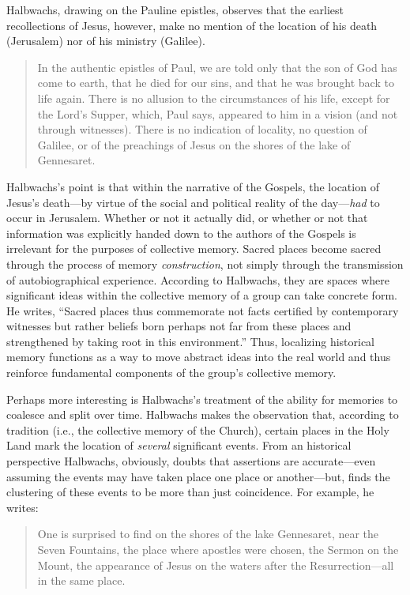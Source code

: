 Halbwachs, drawing on the Pauline epistles, observes that the earliest
recollections of Jesus, however, make no mention of the location of his
death (Jerusalem) nor of his ministry (Galilee).

\begin{quote}
In the authentic epistles of Paul, we are told only that the son of God
has come to earth, that he died for our sins, and that he was brought
back to life again. There is no allusion to the circumstances of his
life, except for the Lord's Supper, which, Paul says, appeared to him in
a vision (and not through witnesses). There is no indication of
locality, no question of Galilee, or of the preachings of Jesus on the
shores of the lake of Gennesaret.\autocite[209]{halbwachs1992}
\end{quote}

Halbwachs's point is that within the narrative of the Gospels, the
location of Jesus's death---by virtue of the social and political
reality of the day---\emph{had} to occur in
Jerusalem.\autocite[211]{halbwachs1992} Whether or not it actually did,
or whether or not that information was explicitly handed down to the
authors of the Gospels is irrelevant for the purposes of collective
memory. Sacred places become sacred through the process of memory
\emph{construction}, not simply through the transmission of
autobiographical experience. According to Halbwachs, they are spaces
where significant ideas within the collective memory of a group can take
concrete form. He writes, ``Sacred places thus commemorate not facts
certified by contemporary witnesses but rather beliefs born perhaps not
far from these places and strengthened by taking root in this
environment.''\autocite[199]{halbwachs1992} Thus, localizing historical
memory functions as a way to move abstract ideas into the real world and
thus reinforce fundamental components of the group's collective memory.

Perhaps more interesting is Halbwachs's treatment of the ability for
memories to coalesce and split over time. Halbwachs makes the
observation that, according to tradition (i.e., the collective memory of
the Church), certain places in the Holy Land mark the location of
\emph{several} significant events. From an historical perspective
Halbwachs, obviously, doubts that assertions are accurate---even
assuming the events may have taken place one place or another---but,
finds the clustering of these events to be more than just coincidence.
For example, he writes:

\begin{quote}
One is surprised to find on the shores of the lake Gennesaret, near the
Seven Fountains, the place where apostles were chosen, the Sermon on the
Mount, the appearance of Jesus on the waters after the
Resurrection---all in the same place.\autocite[220]{halbwachs1992}
\end{quote}

